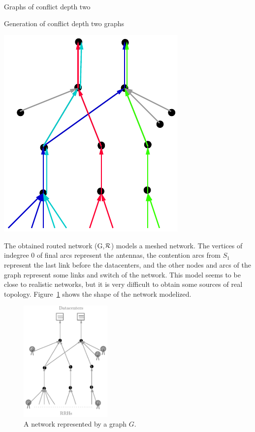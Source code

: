 \documentclass[10pt]{article}
\begin{document}
\begin{section}{Graphs of conflict depth two}
\begin{subsection}{Generation of conflict depth two graphs}
\begin{minipage}{.5\linewidth}
\end{minipage}
\begin{minipage}{.5\linewidth}
\begin{center}
\includegraphics[width=0.4\linewidth]{extendendgraph3}
\label{fig:extendendgraph3}
\end{center}
\end{minipage}
  The obtained routed network (G,$\cal{R}$) models a meshed network. The vertices of indegree $0$ of final arcs represent the antennas, the contention arcs from $S_1$ represent the last link before the datacenters, and the other nodes and arcs of the graph represent some links and switch of the network. This model seems to be close to realistic networks, but it is very difficult to obtain some sources of real topology.
  Figure~\ref{fig:extendendgraphgrey} shows the shape of the network modelized.

\begin{figure}[h]
\begin{center}
 \includegraphics[width=0.4\textwidth]{extendendgraphgrey}
\caption{A network represented by a graph $G$.}\label{fig:extendendgraphgrey}
\end{center}
\end{figure}
    \end{subsection}


\end{section}
\end{document}
